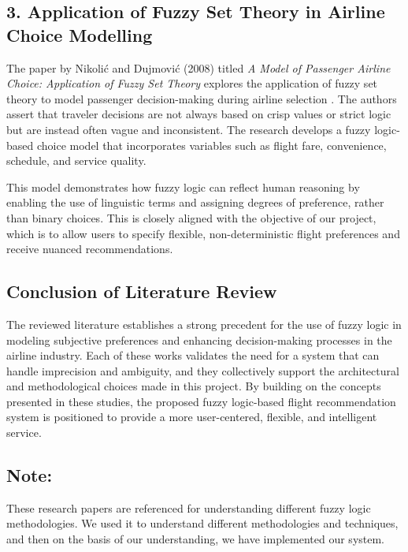 \documentclass[a4paper]{article}
\begin{document}
\subsection*{3. Application of Fuzzy Set Theory in Airline Choice Modelling}

The paper by Nikolić and Dujmović (2008) titled \textit{A Model of Passenger Airline Choice: Application of Fuzzy Set Theory} explores the application of fuzzy set theory to model passenger decision-making during airline selection \cite{nikolic2008model}. The authors assert that traveler decisions are not always based on crisp values or strict logic but are instead often vague and inconsistent. The research develops a fuzzy logic-based choice model that incorporates variables such as flight fare, convenience, schedule, and service quality.

This model demonstrates how fuzzy logic can reflect human reasoning by enabling the use of linguistic terms and assigning degrees of preference, rather than binary choices. This is closely aligned with the objective of our project, which is to allow users to specify flexible, non-deterministic flight preferences and receive nuanced recommendations.

\subsection*{Conclusion of Literature Review}

The reviewed literature establishes a strong precedent for the use of fuzzy logic in modeling subjective preferences and enhancing decision-making processes in the airline industry. Each of these works validates the need for a system that can handle imprecision and ambiguity, and they collectively support the architectural and methodological choices made in this project. By building on the concepts presented in these studies, the proposed fuzzy logic-based flight recommendation system is positioned to provide a more user-centered, flexible, and intelligent service.

\subsection*{Note: }

These research papers are referenced for understanding different fuzzy logic methodologies. We used it to understand different methodologies and techniques, and then on the basis of our understanding, we have implemented our system.
\end{document}
